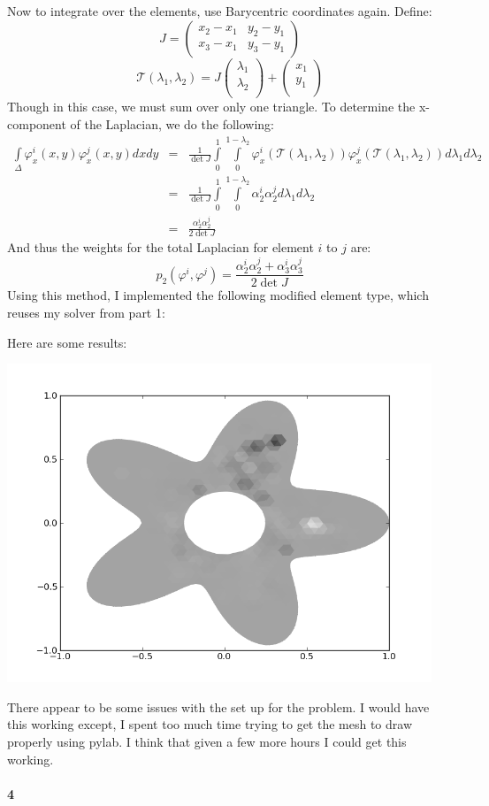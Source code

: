 \documentclass{article}
\begin{document}
Now to integrate over the elements, use Barycentric coordinates again.  Define:
\[ J = \left( \begin{array}{cc}
x_2 - x_1 & y_2 - y_1 \\
x_3 - x_1 & y_3 - y_1
\end{array} \right) \]
\[ \mathcal{T}(\lambda_1, \lambda_2) = J \left( \begin{array}{c}
\lambda_1 \\
\lambda_2 \\
\end{array} \right) + \left( \begin{array}{c}
x_1 \\
y_1 \\
\end{array} \right) \]
Though in this case, we must sum over only one triangle.  To determine the x-component of the Laplacian, we do the following:
\begin{eqnarray*}
\int \limits_{\Delta} \varphi^i_{x}(x,y) \varphi^j_{x}(x,y) dx dy 
& = &
	\frac{1}{\det J} \int \limits_0^1 \int \limits_0^{1-\lambda_2}
		\varphi^i_{x}(\mathcal{T}(\lambda_1, \lambda_2)) 
		\varphi^j_{x}(\mathcal{T}(\lambda_1, \lambda_2)) d \lambda_1 d \lambda_2 \\
& = & 
	\frac{1}{\det J} \int \limits_{0}^{1} \int \limits_0^{1 - \lambda_2} 
		\alpha^i_2 \alpha^j_2 d \lambda_1 d \lambda_2 \\
& = & \frac{\alpha^i_2 \alpha^j_2}{2 \det J}
\end{eqnarray*}
And thus the weights for the total Laplacian for element $i$ to $j$ are:
\[ p_2(\varphi^i, \varphi^j) = \frac{\alpha^i_2 \alpha^j_2 + \alpha^i_3 \alpha^j_3}{2 \det J} \]
Using this method, I implemented the following modified element type, which reuses my solver from part 1:





Here are some results:
\begin{center}
\includegraphics[width=5in]{prob3_result.png}
\end{center}

There appear to be some issues with the set up for the problem.  I would have this working except, I spent too much time trying to get the mesh to draw properly using pylab. I think that given a few more hours I could get this working.

\paragraph{4}
\end{document}
